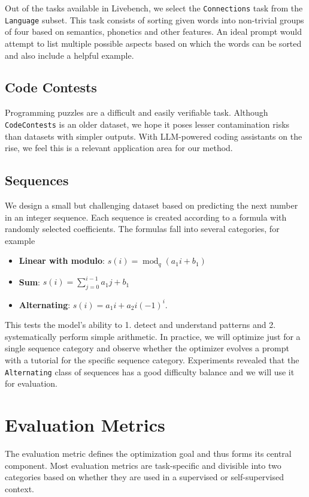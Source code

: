 Out of the tasks available in Livebench, we select the \texttt{Connections} task from the \texttt{Language} subset. 
This task consists of sorting given words into non-trivial groups of four based on semantics, phonetics and other features. 
An ideal prompt would attempt to list multiple possible aspects based on which the words can be sorted and also include a helpful example.

\subsection{Code Contests}
Programming puzzles are a difficult and easily verifiable task. Although \texttt{CodeContests}\cite{li2022competition} is an older dataset, 
we hope it poses lesser contamination risks than datasets with simpler outputs. With LLM-powered coding assistants on the rise, we
feel this is a relevant application area for our method. 

\subsection{Sequences}
We design a small but challenging dataset based on predicting the next number in an integer sequence.
Each sequence is created according to a formula with randomly selected coefficients. The formulas fall into several categories, for example
\begin{itemize}
    \item \textbf{Linear with modulo}: $s(i) = \operatorname{mod}_{q}(a_{1} i + b_{1})$
    \item \textbf{Sum}: $s(i) = \sum_{j=0}^{i-1}a_{1} j + b_{1}$
    \item \textbf{Alternating}: $s(i) = a_{1}i + a_{2}i(-1)^{i}$.
\end{itemize}
This tests the model's ability to 1. detect and understand patterns and 2. systematically perform simple arithmetic. 
In practice, we will optimize just for a single sequence category and observe whether the optimizer evolves a prompt with a tutorial for the specific sequence category.
Experiments revealed that the \texttt{Alternating} class of sequences has a good difficulty balance and we will use it for evaluation.

\section{Evaluation Metrics}
The evaluation metric defines the optimization goal and thus forms its central component. 
Most evaluation metrics are task-specific and divisible into two categories based on whether they are used in a supervised or self-supervised context.
